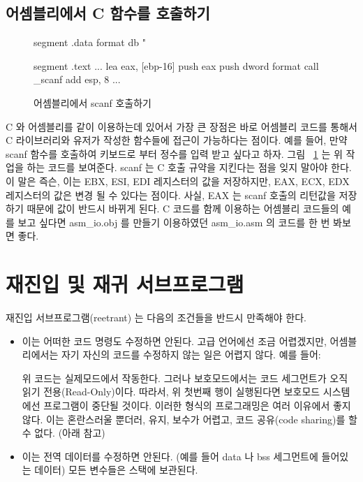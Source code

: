 \subsection{어셈블리에서 C 함수를 호출하기}

\begin{figure}[t]
\begin{AsmCodeListing}[frame=single]
segment .data
format       db "%

segment .text
...
      lea    eax, [ebp-16]
      push   eax
      push   dword format
      call   _scanf
      add    esp, 8
...
\end{AsmCodeListing}
\caption{어셈블리에서 {\code scanf} 호출하기\label{fig:scanf}}
\end{figure}

C 와 어셈블리를 같이 이용하는데 있어서 가장 큰 장점은 바로 어셈블리 코드를 
통해서 C 라이브러리와 유저가 작성한 함수들에 접근이 가능하다는 점이다.
예를 들어, 만약 {\code scanf} 함수를 호출하여 키보드로 부터 정수를 
입력 받고 싶다고 하자. 그림 ~\ref{fig:scanf} 는 위 작업을 하는 코드를
보여준다. {\code scanf} 는 C 호출 규약을 지킨다는 점을 잊지 말아야 한다. 
이 말은 즉슨, 이는 EBX, ESI, EDI 레지스터의 값을 저장하지만, EAX, ECX, EDX
레지스터의 값은 변경 될 수 있다는 점이다. 사실, EAX 는 {\code scanf} 호출의
리턴값을 저장하기 때문에 값이 반드시 바뀌게 된다. C 코드를 함께 이용하는 어셈블리
코드들의 예를 보고 싶다면 {\code asm\_io.obj} 를 만들기 이용하였던
{\code asm\_io.asm} 의 코드를 한 번 봐보면 좋다. 


\section{재진입 및 재귀 서브프로그램}

재진입 서브프로그램(reetrant) 는 다음의 조건들을 반드시 만족해야 한다. 

\begin{itemize}
\item 
이는 어떠한 코드 명령도 수정하면 안된다. 고급 언어에선 조금 어렵겠지만,
어셈블리에서는 자기 자신의 코드를 수정하지 않는 일은 어렵지 않다. 예를 들어:


위 코드는 실제모드에서 작동한다. 그러나 보호모드에서는 코드 세그먼트가 오직
읽기 전용(Read-Only)이다. 따라서, 위 첫번째 행이 실행된다면 보호모드 시스템에선 프로그램이
중단될 것이다. 이러한 형식의 프로그래밍은 여러 이유에서 좋지 않다. 이는 혼란스러울
뿐더러, 유지, 보수가 어렵고, 코드 공유(code sharing)를 할 수 없다. (아래 참고)

\item 이는 전역 데이터를 수정하면 안된다. (예를 들어 {\code data} 나
{\code bss} 세그먼트에 들어있는 데이터) 모든 변수들은 스택에 보관된다. 

\end{itemize}

